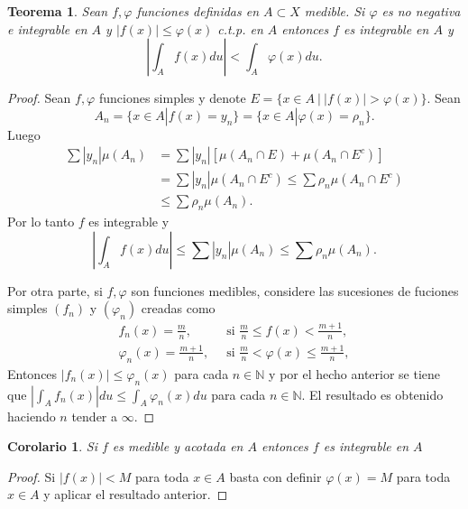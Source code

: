 \documentclass[twoside,12pt,a4 paper,openright]{book}
\newtheorem{teo}[claim]{Teorema}
\newtheorem{cor}[claim]{Corolario}
\begin{document}
\begin{teo}\label{teoremacomparacion}
    Sean $f,\varphi$ funciones definidas en $A\subset X$ medible. Si   $\varphi$ es no negativa e integrable en $A$ y  $|f(x)|\leq \varphi(x)$ c.t.p. en $A$ entonces $f$ es integrable en $A$ y 
    $$\left|\int_A f(x)du\right|< \int_A \varphi(x) du.$$
\end{teo}
\begin{proof}
    Sean $f,\varphi$ funciones simples y denote  $E=\{x\in A \ | \ |f(x)| >\varphi(x)\}$. Sean 
    $$A_n = \{x\in A | f(x) = y_n\} = \{x\in A | \varphi(x) = \rho_n\}.$$
     Luego
    \begin{align*}
        \sum |y_n|\mu(A_n) &= \sum |y_n|[\mu(A_n\cap E) + \mu(A_n \cap E^c)]\\
                           &= \sum |y_n| \mu(A_n\cap E^c) \leq \sum \rho_n \mu(A_n\cap E^c)\\
                           &\leq  \sum \rho_n \mu(A_n) .
    \end{align*}
    Por lo tanto $f$ es integrable y 
    $$\left|\int_A f(x)du\right|\leq \sum |y_n|\mu(A_n) \leq  \sum \rho_n \mu(A_n) .$$


Por otra parte, si $f,\varphi$ son funciones medibles, considere las sucesiones de fuciones simples $(f_n)$ y $(\varphi_n)$ creadas como 
  \begin{align*}
  \displaystyle f_n(x) =   \frac{m}{n} ,  &  \   \textrm{ si }  \displaystyle \frac{m}{n}\leq f(x) < \frac{m+ 1}{n},\\
  \displaystyle \varphi_n(x) =   \frac{m+1}{n} , &  \   \textrm{ si }  \frac{m}{n}< \varphi (x) \leq  \frac{m+ 1}{n},
    \end{align*}
       Entonces $|f_n(x) | \leq \varphi_n(x)$ para cada $n\in \mathbb{N}$ y por el hecho anterior se tiene que 
       $| \displaystyle\int_A f_n(x) | du \leq \int_A \varphi_n(x) du$ para cada $n\in \mathbb{N}$. El resultado es obtenido haciendo $n$ tender  a $\infty$.
\end{proof}




\begin{cor}
    Si $f$ es medible y acotada en $A$ entonces $f$ es integrable en $A$
\end{cor}
\begin{proof}
    Si $|f(x)| < M$ para toda $x\in A$ basta con definir $\varphi(x) = M$ para toda $x\in A$ y aplicar el resultado anterior.
\end{proof}
\end{document}
